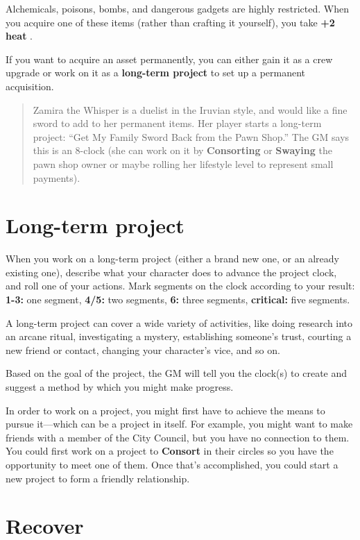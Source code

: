 \documentclass[11pt,fleqn,a5paper]{book}
\newcommand{\gameterm}[1]{\textbf{#1}}
\begin{document}
Alchemicals, poisons, bombs, and dangerous gadgets are highly restricted. When you acquire one of these items (rather than crafting it yourself), you take \textbf{+2} \gameterm{heat} .

If you want to acquire an asset permanently, you can either gain it as a crew upgrade or work on it as a \textbf{long-term project} to set up a permanent acquisition.

\begin{quote}
	Zamira the Whisper is a duelist in the Iruvian style, and would like a fine sword to add to her permanent items. Her player starts a long-term project: “Get My Family Sword Back from the Pawn Shop.” The GM says this is an 8-clock (she can work on it by \gameterm{Consorting}  or \gameterm{Swaying}  the pawn shop owner or maybe rolling her lifestyle level to represent small payments).
\end{quote} 

\section{Long-term project}

When you work on a long-term project (either a brand new one, or an already existing one), describe what your character does to advance the project clock, and roll one of your actions. Mark segments on the clock according to your result: \gameterm{1-3:}  one segment, \gameterm{4/5:}  two segments, \gameterm{6:}  three segments, \gameterm{critical:}  five segments.

A long-term project can cover a wide variety of activities, like doing research into an arcane ritual, investigating a mystery, establishing someone’s trust, courting a new friend or contact, changing your character’s vice, and so on.

Based on the goal of the project, the GM will tell you the clock(s) to create and suggest a method by which you might make progress.

In order to work on a project, you might first have to achieve the means to pursue it---which can be a project in itself. For example, you might want to make friends with a member of the City Council, but you have no connection to them. You could first work on a project to \gameterm{Consort}  in their circles so you have the opportunity to meet one of them. Once that’s accomplished, you could start a new project to form a friendly relationship.

\section{Recover}
\end{document}
